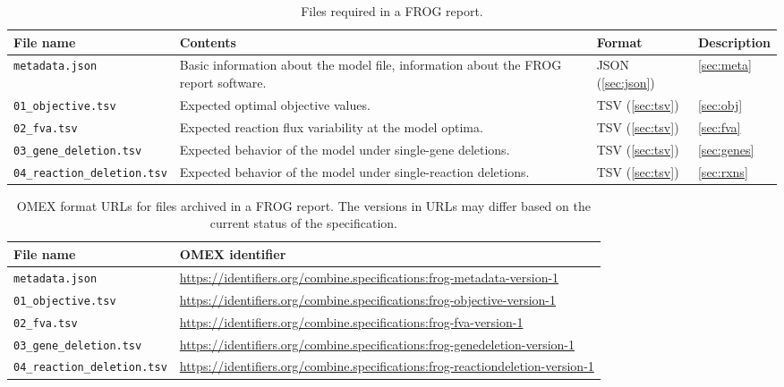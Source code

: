 \begin{table}\tablefont
\begin{tabular}{lp{.3\linewidth}ll}
\toprule
File name & Contents & Format & Description \\
\midrule
\texttt{metadata.json}
 & Basic information about the model file, information about the FROG report software.
 & JSON (\cref{sec:json})
 & \cref{sec:meta}
 \\\addlinespace
\texttt{01\_objective.tsv}
 & Expected optimal objective values.
 & TSV (\cref{sec:tsv})
 & \cref{sec:obj}
 \\\addlinespace
\texttt{02\_fva.tsv}
 & Expected reaction flux variability at the model optima.
 & TSV (\cref{sec:tsv})
 & \cref{sec:fva}
 \\\addlinespace
\texttt{03\_gene\_deletion.tsv}
 & Expected behavior of the model under single-gene deletions.
 & TSV (\cref{sec:tsv})
 & \cref{sec:genes}
 \\\addlinespace
\texttt{04\_reaction\_deletion.tsv}
 & Expected behavior of the model under single-reaction deletions.
 & TSV (\cref{sec:tsv})
 & \cref{sec:rxns} \\
\bottomrule
\end{tabular}
\caption{Files required in a FROG report.}
\label{tab:files}
\end{table}

\begin{table}\tablefont
\begin{tabular}{lp{.6\linewidth}}
\toprule
File name & OMEX identifier \\
\midrule
\texttt{metadata.json}
 & \url{https://identifiers.org/combine.specifications:frog-metadata-version-1}
 \\
\texttt{01\_objective.tsv}
 & \url{https://identifiers.org/combine.specifications:frog-objective-version-1}
 \\
\texttt{02\_fva.tsv}
 & \url{https://identifiers.org/combine.specifications:frog-fva-version-1}
 \\
\texttt{03\_gene\_deletion.tsv}
 & \url{https://identifiers.org/combine.specifications:frog-genedeletion-version-1}
 \\
\texttt{04\_reaction\_deletion.tsv}
 & \url{https://identifiers.org/combine.specifications:frog-reactiondeletion-version-1}
 \\
\bottomrule
\end{tabular}
\caption{OMEX format URLs for files archived in a FROG report. The versions in URLs may differ based on the current status of the specification.}
\label{tab:omex}
\end{table}


